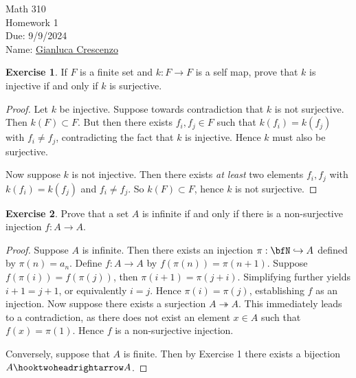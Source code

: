 \documentclass[10pt,twoside,openany]{memoir}
\theoremstyle{plain}
\theoremstyle{definition}
\newtheorem{exercise}{Exercise}
\theoremstyle{remark}
\numberwithin{equation}{section}
\begin{document}
\begin{center}
    { \Large Math 310 \\[0.1in]Homework 1 \\[0.1in]
    Due: 9/9/2024}\\[.25in]
    { Name:} {\underline{Gianluca Crescenzo\hspace*{2in}}}\\[0.15in]
    \end{center}
    \vspace{4pt}
    \begin{exercise}
        If $F$ is a finite set and $k:F \rightarrow F$ is a self map, prove that $k$ is injective if and only if $k$ is surjective.
    \end{exercise}
        \begin{proof}
             Let $k$ be injective. Suppose towards contradiction that $k$ is not surjective. Then $k(F) \subset F$. But then there exists $f_i,f_j \in F$ such that $k(f_i) = k(f_j)$ with $f_i \neq f_j$, contradicting the fact that $k$ is injective. Hence $k$ must also be surjective. 

            Now suppose $k$ is not injective. Then there exists \textit{at least} two elements $f_i,f_j$ with $k(f_i) = k(f_j)$ and $f_i \neq f_j$. So $k(F) \subset F$, hence $k$ is not surjective.
        \end{proof}
    \begin{exercise}\label{example:2}
        Prove that a set $A$ is infinite if and only if there is a non-surjective injection $f:A \rightarrow A$.
    \end{exercise}
        \begin{proof}
            Suppose $A$ is infinite. Then there exists an injection $\pi:\bfN \hookrightarrow A$ defined by $\pi(n) = a_n$. Define $f:A \rightarrow A$ by $f(\pi(n)) = \pi(n+1)$. Suppose $f(\pi(i)) = f(\pi(j))$, then $\pi(i+1) = \pi(j+i)$. Simplifying further yields $i+1 = j+1$, or equivalently $i = j$. Hence $\pi(i) = \pi(j)$, establishing $f$ as an injection. Now suppose there exists a surjection $A \twoheadrightarrow A$. This immediately leads to a contradiction, as there does not exist an element $x \in A$ such that $f(x) = \pi(1)$. Hence $f$ is a non-surjective injection.

            Conversely, suppose that $A$ is finite. Then by Exercise 1 there exists a bijection $A \hooktwoheadrightarrow A$.
        \end{proof}
\end{document}
